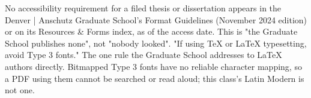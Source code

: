 
	{No accessibility requirement for a filed thesis or dissertation appears in
	 the Denver | Anschutz Graduate School's Format Guidelines (November 2024
	 edition) or on its Resources \& Forms index, as of the access date. This is
	 "the Graduate School publishes none", not "nobody looked".}
	{"If using TeX or LaTeX typesetting, avoid Type 3 fonts." The one rule the
	 Graduate School addresses to LaTeX authors directly. Bitmapped Type 3 fonts
	 have no reliable character mapping, so a PDF using them cannot be searched
	 or read aloud; this class's Latin Modern is not one.}

%
\providecommand{\cupriordegrees@list}{}
\newcommand{\cupriordegrees}[1]{\renewcommand{\cupriordegrees@list}{#1}}
\providecommand{\cuapprovaldate@text}{$\langle$last day of the semester$\rangle$}
\newcommand{\cuapprovaldate}[1]{\renewcommand{\cuapprovaldate@text}{#1}}

